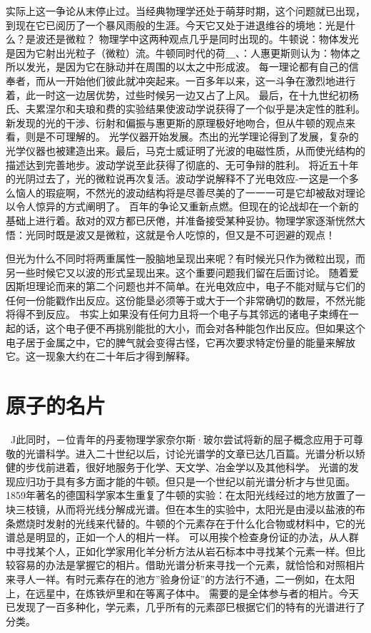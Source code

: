 实际上这一争论从末停止过。当经典物理学还处于萌芽时期，这个问题就已出现，到现在它已阅历了一个暴风雨般的生涯。今天它又处于进退维谷的境地：光是什么？是波还是微粒？
物理学中这两种观点几乎是同时出现的。牛顿说：物体发光是因为它射出光粒子（微粒）流。牛顿同时代的荷＿、：人惠更斯则认为：物体之所以发光，是因为它在脉动并在周围的以太之中形成波。
每一理论都有自己的信奉者，而从一开始他们彼此就冲突起来。一百多年以来，这一斗争在激烈地进行着，此一时这一边居优势，过些时候另一边又占了上风。
最后，在十九世纪初杨氏、夫累涅尔和夫琅和费的实验结果使波动学说获得了一个似乎是决定性的胜利。新发现的光的干涉、衍射和偏振与惠更斯的原理极好地吻合，但从牛顿的观点来看，则是不可理解的。
光学仪器开始发展。杰出的光学理论得到了发展，复杂的光学仪器也被建造出来。最后，马克士威证明了光波的电磁性质，从而使光结构的描述达到完善地步。波动学说至此获得了彻底的、无可争辩的胜利。
将近五十年的光阴过去了，光的微粒说再次复活。波动学说解释不了光电效应-一这是一个多么恼人的瑕疵啊，不然光的波动结构将是尽善尽美的了一一一可是它却被敌对理论以令人惊异的方式阐明了。
百年的争论又重新点燃。但现在的论战却在一个新的基础上进行着。敌对的双方都已厌倦，并准备接受某种妥协。物理学家逐渐恍然大悟：光同时既是波又是微粒，这就是令人吃惊的，但又是不可迥避的观点！

但光为什么不同时将两重属性一股脑地呈现出来呢？有时候光只作为微粒出现，而另一些时候它又以波的形式呈现出来。这个重要问题我们留在后面讨论。
随着爱因斯坦理论而来的第二个问题也并不简单。在光电效应中，电子不能对赋与它们的任何一份能戳作出反应。这份能垦必须等于或大于一个非常确切的数屉，不然光能将得不到反应。
书实上如果没有任何力且将一个电子与其邻远的诸电子束缚在一起的话，这个电子便不再挑别能批的大小，而会对各种能包作出反应。但如果这个电子居于金属之中，它的脾气就会变得古怪，它再次要求特定份量的能量来解放它。这一现象大约在二十年后才得到解释。

\section{原子的名片}

~J此同时，－位青年的丹麦物理学家奈尔斯·玻尔尝试将新的屈子概念应用于可尊敬的光谱科学。进入二十世纪以后，讨论光谱学的文章已达几百篇。光谱分析以矫健的步伐前进着，很好地服务于化学、天文学、冶金学以及其他科学。
光谱的发现应归功于具有多方面才能的牛顿。但只是一个世纪以前光谱分析才与世见面。1859年著名的德国科学家本生重复了牛顿的实验：在太阳光线经过的地方放置了一块三枝镜，从而将光线分解成光谱。但在本生的实验中，太阳光是由浸以盐液的布条燃烧时发射的光线来代替的。牛顿的个元素存在于什么化合物或材料中，它的光谱总是明显的，正如一个人的相片一样。
可以用挨个检查身份证的办法，从人群中寻找某个人，正如化学家用化羊分析方法从岩石标本中寻找某个元素一样。但比较容易的办法是掌握它的相片。借助光谱分析来寻找一个元素，就恰恰和对照相片来寻人一祥。有时元素存在的池方”验身份证”的方法行不通，二一例如，在太阳上，在远星中，在炼铁炉里和在等离子体中。
需要的是全体参与者的相片。今天已发现了一百多种化，学元素，几乎所有的元素邵巳根据它们的特有的光谱进行了分类。

